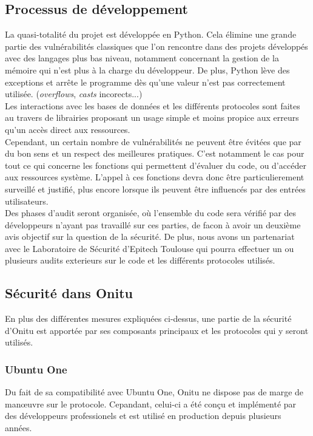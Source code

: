 \subsection{Processus de développement}

La quasi-totalité du projet est développée en Python. Cela élimine une grande partie des vulnérabilités classiques que l'on rencontre dans des projets développés avec des langages plus bas niveau, notamment concernant la gestion de la mémoire qui n'est plus à la charge du développeur. De plus, Python lève des exceptions et arrête le programme dès qu'une valeur n'est pas correctement utilisée. (\textit{overflows}, \textit{casts} incorects...)\\

Les interactions avec les bases de données et les différents protocoles sont faites au travers de librairies proposant un usage simple et moins propice aux erreurs qu'un accès direct aux ressources.\\

Cependant, un certain nombre de vulnérabilités ne peuvent être évitées que par du bon sens et un respect des meilleures pratiques. C'est notamment le cas pour tout ce qui concerne les fonctions qui permettent d'évaluer du code, ou d'accéder aux ressources système. L'appel à ces fonctions devra donc être particulierement surveillé et justifié, plus encore lorsque ils peuvent être influencés par des entrées utilisateurs.\\

Des phases d'audit seront organisée, où l'ensemble du code sera vérifié par des développeurs n'ayant pas travaillé sur ces parties, de facon à avoir un deuxième avis objectif sur la question de la sécurité. De plus, nous avons un partenariat avec le Laboratoire de Sécurité d'Epitech Toulouse qui pourra effectuer un ou plusieurs audits exterieurs sur le code et les différents protocoles utilisés.

\subsection{Sécurité dans Onitu}

En plus des différentes mesures expliquées ci-dessus, une partie de la sécurité d'Onitu est apportée par ses composants principaux et les protocoles qui y seront utilisés.

\subsubsection{Ubuntu One}
Du fait de sa compatibilité avec Ubuntu One, Onitu ne dispose pas de marge de manœuvre sur le protocole. Cepandant, celui-ci a été conçu et implémenté par des développeurs professionels et est utilisé en production depuis plusieurs années.\\

